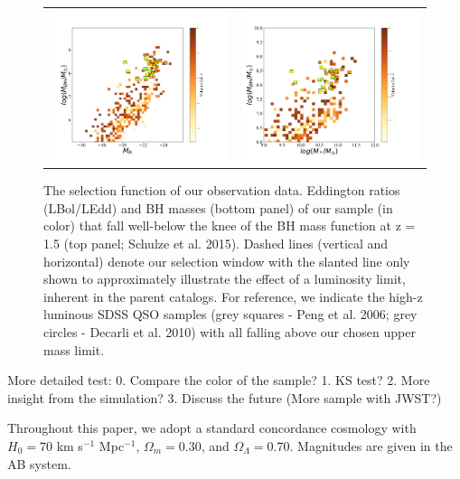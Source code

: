 \documentclass{natureprintstyle}
\begin{document}
\begin{figure}%
\begin{tabular}{c c}
\includegraphics[width=0.5\linewidth]{SAM_ML.pdf} &
\includegraphics[width=0.5\linewidth]{SAM_MMstar.pdf} \\
\end{tabular}
\caption{
The selection function of our observation data.
Eddington ratios (LBol/LEdd) and BH masses (bottom panel) of our sample (in color) that fall well-below the knee of the BH mass function at z = 1.5 (top panel; Schulze et al. 2015). Dashed lines (vertical and horizontal) denote our selection window with the slanted line only shown to approximately illustrate the effect of a luminosity limit, inherent in the parent catalogs. For reference, we indicate the high-z luminous SDSS QSO samples (grey squares - Peng et al. 2006; grey circles - Decarli et al. 2010) with all falling above our chosen upper mass limit.
}
\label{fig:SAM_comp}
\end{figure}

More detailed test:
0. Compare the color of the sample?
1. KS test? 
2. More insight from the simulation?
3. Discuss the future (More sample with JWST?)

Throughout this paper, we adopt a standard concordance cosmology with $H_0= 70$ km s$^{-1}$ Mpc$^{-1}$, $\Omega{_m} = 0.30$, and $\Omega{_\Lambda} = 0.70$. Magnitudes are given in the AB system.
\end{document}

